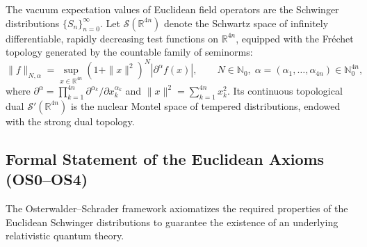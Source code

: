 The vacuum expectation values of Euclidean field operators are the Schwinger distributions $\{S_n\}_{n=0}^\infty$. Let $\mathcal{S}(\mathbb{R}^{4n})$ denote the Schwartz space of infinitely differentiable, rapidly decreasing test functions on $\mathbb{R}^{4n}$, equipped with the Fr\'echet topology generated by the countable family of seminorms:
\begin{equation}
\label{eq:schwartz_seminorms}
\|f\|_{N, \alpha} = \sup_{x \in \mathbb{R}^{4n}} \left( 1 + \|x\|^2 \right)^N \left| \partial^\alpha f(x) \right|, \qquad N \in \mathbb{N}_0, \; \alpha = (\alpha_1, \dots, \alpha_{4n}) \in \mathbb{N}_0^{4n},
\end{equation}
where $\partial^\alpha = \prod_{k=1}^{4n} \partial^{\alpha_k} / \partial x_k^{\alpha_k}$ and $\|x\|^2 = \sum_{k=1}^{4n} x_k^2$. Its continuous topological dual $\mathcal{S}'(\mathbb{R}^{4n})$ is the nuclear Montel space of tempered distributions, endowed with the strong dual topology.

\subsection{Formal Statement of the Euclidean Axioms (OS0--OS4)}
\label{subsec:os_axioms_formulation}

The Osterwalder--Schrader framework axiomatizes the required properties of the Euclidean Schwinger distributions to guarantee the existence of an underlying relativistic quantum theory.

